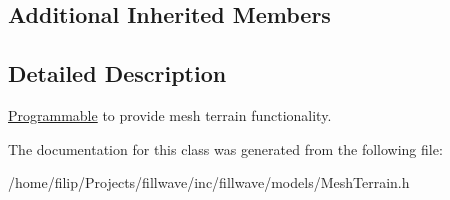 \subsection*{Additional Inherited Members}


\subsection{Detailed Description}
\hyperlink{classflw_1_1flf_1_1Programmable}{Programmable} to provide mesh terrain functionality. 

The documentation for this class was generated from the following file\+:\begin{DoxyCompactItemize}
\item 
/home/filip/\+Projects/fillwave/inc/fillwave/models/Mesh\+Terrain.\+h\end{DoxyCompactItemize}
